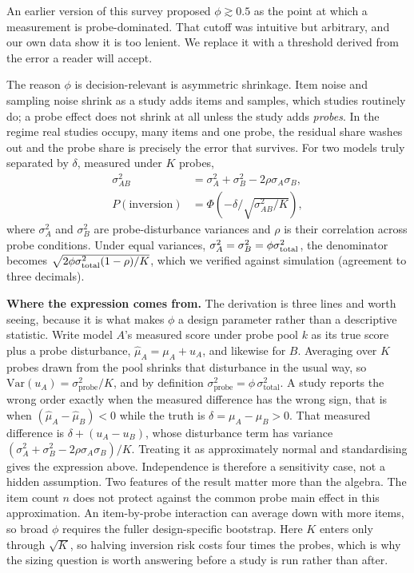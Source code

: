 \documentclass[11pt]{article}
\begin{document}
An earlier version of this survey proposed $\phi\gtrsim0.5$ as the point at which
a measurement is probe-dominated. That cutoff was intuitive but arbitrary, and
our own data show it is too lenient. We replace it with a threshold derived from
the error a reader will accept.

The reason $\phi$ is decision-relevant is asymmetric shrinkage. Item noise and
sampling noise shrink as a study adds items and samples, which studies routinely
do; a probe effect does not shrink at all unless the study adds \emph{probes}.
In the regime real studies occupy, many items and one probe, the residual share
washes out and the probe share is precisely the error that survives. For two
models truly separated by $\delta$, measured under $K$ probes,
\[
\begin{aligned}
\sigma_{AB}^2&=\sigma_A^2+\sigma_B^2-2\rho\sigma_A\sigma_B,\\
P(\text{inversion})&=\Phi\!\left(-\delta/\sqrt{\sigma_{AB}^2/K}\right),
\end{aligned}
\]
where $\sigma_A^2$ and $\sigma_B^2$ are probe-disturbance variances and $\rho$
is their correlation across probe conditions. Under equal variances,
$\sigma_A^2=\sigma_B^2=\phi\sigma^2_{\rm total}$, the denominator becomes
$\sqrt{2\phi\sigma^2_{\rm total}(1-\rho)/K}$,
which we verified against simulation (agreement to three decimals).

\textbf{Where the expression comes from.} The derivation is three lines and worth
seeing, because it is what makes $\phi$ a design parameter rather than a
descriptive statistic. Write model $A$'s measured score under probe pool $k$ as
its true score plus a probe disturbance, $\hat\mu_A=\mu_A+u_A$, and likewise for
$B$. Averaging over $K$ probes drawn from the pool shrinks that disturbance in
the usual way, so $\mathrm{Var}(u_A)=\sigma^2_{\text{probe}}/K$, and by
definition $\sigma^2_{\text{probe}}=\phi\,\sigma^2_{\text{total}}$. A study
reports the wrong order exactly when the measured difference has the wrong sign,
that is when $(\hat\mu_A-\hat\mu_B)<0$ while the truth is
$\delta=\mu_A-\mu_B>0$. That measured difference is $\delta+(u_A-u_B)$, whose
disturbance term has variance
$(\sigma_A^2+\sigma_B^2-2\rho\sigma_A\sigma_B)/K$. Treating it as approximately
normal and standardising gives the expression above. Independence is therefore
a sensitivity case, not a hidden assumption.
Two features of the result matter more than the algebra. The item count $n$ does
not protect against the common probe main effect in this approximation. An
item-by-probe interaction can average down with more items, so broad $\phi$
requires the fuller design-specific bootstrap. Here $K$ enters only through
$\sqrt{K}$, so
halving inversion risk costs four times the probes, which is why the sizing
question is worth answering before a study is run rather than after.
\end{document}
